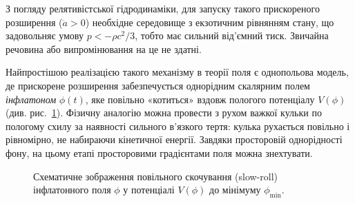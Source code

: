 \documentclass[12pt, a4paper]{article}
\begin{document}
З погляду релятивістської гідродинаміки, для запуску такого прискореного
розширення ($\ddot{a} > 0$) необхідне середовище з екзотичним рівнянням
стану, що задовольняє умову $p < -\rho c^2 / 3$, тобто має сильний
від'ємний тиск. Звичайна речовина або випромінювання на це не здатні.

Найпростішою реалізацією такого механізму в теорії поля є однопольова
модель, де прискорене розширення забезпечується однорідним скалярним
полем \emph{інфлатоном} $\phi(t)$, яке повільно «котиться» вздовж
пологого потенціалу $V(\phi)$ (див. рис.~\ref{fig:slow_roll}). Фізичну аналогію можна провести з
рухом важкої кульки по пологому схилу за наявності сильного
в'язкого тертя: кулька рухається повільно і рівномірно, не
набираючи кінетичної енергії. Завдяки просторовій однорідності
фону, на цьому етапі просторовими градієнтами поля можна знехтувати.

\begin{figure}[h!]
\centering
{}

\caption{Схематичне зображення повільного скочування (slow-roll) інфлатонного поля $\phi$ у потенціалі $V(\phi)$ до мінімуму $\phi_{\min}$.}
\label{fig:slow_roll}
\end{figure}
\end{document}
